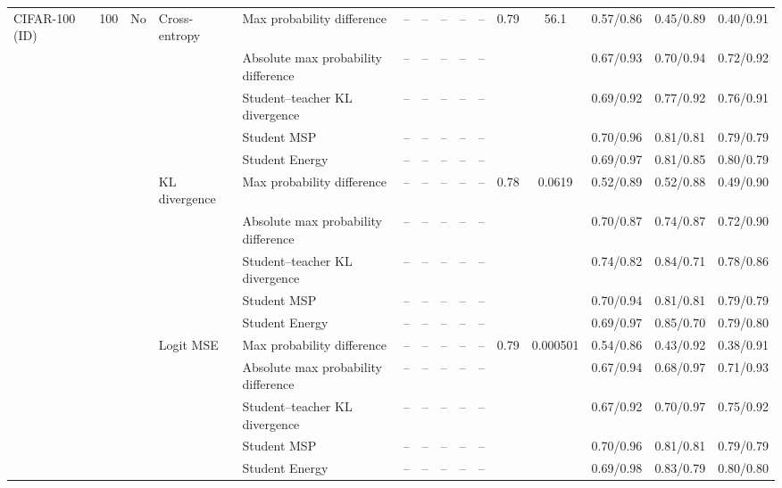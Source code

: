 \documentclass[border=2pt]{standalone}
\begin{document}
\begin{tabular}{lllllcccccccccc}
\addlinespace
CIFAR-100 (ID) & 100 & No & Cross-entropy & Max probability difference & -- & -- & -- & -- & -- & 0.79 & 56.1 & 0.57/0.86 & 0.45/0.89 & 0.40/0.91 \\
 &  &  &  & Absolute max probability difference & -- & -- & -- & -- & -- &  &  & 0.67/0.93 & 0.70/0.94 & 0.72/0.92 \\
 &  &  &  & Student--teacher KL divergence & -- & -- & -- & -- & -- &  &  & 0.69/0.92 & 0.77/0.92 & 0.76/0.91 \\
 &  &  &  & Student MSP & -- & -- & -- & -- & -- &  &  & 0.70/0.96 & 0.81/0.81 & 0.79/0.79 \\
 &  &  &  & Student Energy & -- & -- & -- & -- & -- &  &  & 0.69/0.97 & 0.81/0.85 & 0.80/0.79 \\
 &  &  & KL divergence & Max probability difference & -- & -- & -- & -- & -- & 0.78 & 0.0619 & 0.52/0.89 & 0.52/0.88 & 0.49/0.90 \\
 &  &  &  & Absolute max probability difference & -- & -- & -- & -- & -- &  &  & 0.70/0.87 & 0.74/0.87 & 0.72/0.90 \\
 &  &  &  & Student--teacher KL divergence & -- & -- & -- & -- & -- &  &  & 0.74/0.82 & 0.84/0.71 & 0.78/0.86 \\
 &  &  &  & Student MSP & -- & -- & -- & -- & -- &  &  & 0.70/0.94 & 0.81/0.81 & 0.79/0.79 \\
 &  &  &  & Student Energy & -- & -- & -- & -- & -- &  &  & 0.69/0.97 & 0.85/0.70 & 0.79/0.80 \\
 &  &  & Logit MSE & Max probability difference & -- & -- & -- & -- & -- & 0.79 & 0.000501 & 0.54/0.86 & 0.43/0.92 & 0.38/0.91 \\
 &  &  &  & Absolute max probability difference & -- & -- & -- & -- & -- &  &  & 0.67/0.94 & 0.68/0.97 & 0.71/0.93 \\
 &  &  &  & Student--teacher KL divergence & -- & -- & -- & -- & -- &  &  & 0.67/0.92 & 0.70/0.97 & 0.75/0.92 \\
 &  &  &  & Student MSP & -- & -- & -- & -- & -- &  &  & 0.70/0.96 & 0.81/0.81 & 0.79/0.79 \\
 &  &  &  & Student Energy & -- & -- & -- & -- & -- &  &  & 0.69/0.98 & 0.83/0.79 & 0.80/0.80 \\
\bottomrule
\end{tabular}
\end{document}
